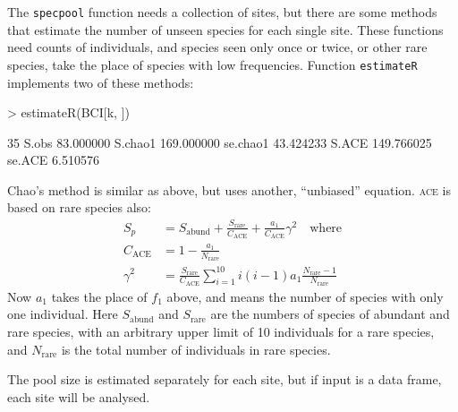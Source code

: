 \documentclass[a4paper,10pt]{amsart}
\begin{document}
The \texttt{specpool} function needs a collection of sites, but there
are some methods that estimate the number of unseen species for each
single site.  These functions need counts of individuals, and species
seen only once or twice, or other rare species, take the place of
species with low frequencies.  Function \texttt{estimateR} implements
two of these methods:
\begin{Schunk}
\begin{Sinput}
> estimateR(BCI[k, ])
\end{Sinput}
\begin{Soutput}
                 35
S.obs     83.000000
S.chao1  169.000000
se.chao1  43.424233
S.ACE    149.766025
se.ACE     6.510576
\end{Soutput}
\end{Schunk}
Chao's method is similar as above, but uses another, ``unbiased''
equation. \textsc{ace} is based on rare species also:
\begin{equation}
\begin{split}
S_p &= S_\mathrm{abund} + \frac{S_\mathrm{rare}}{C_\mathrm{ACE}} +
\frac{a_1}{C_\mathrm{ACE}} \gamma^2 \quad \text{where}\\
C_\mathrm{ACE} &= 1 - \frac{a_1}{N_\mathrm{rare}}\\
\gamma^2 &= \frac{S_\mathrm{rare}}{C_\mathrm{ACE}} \sum_{i=1}^{10} i
(i-1) a_1 \frac{N_\mathrm{rare} - 1}{N_\mathrm{rare}}
\end{split}
\end{equation}
Now $a_1$ takes the place of $f_1$ above, and means the number of
species with only one individual.
Here $S_\mathrm{abund}$ and $S_\mathrm{rare}$ are the numbers of
species of abundant and rare species, with an arbitrary upper limit of
10 individuals for a rare species, and $N_\mathrm{rare}$ is the total
number of individuals in rare species.

The pool size
is estimated separately for each site, but if input is a data frame,
each site will be analysed.
\end{document}
